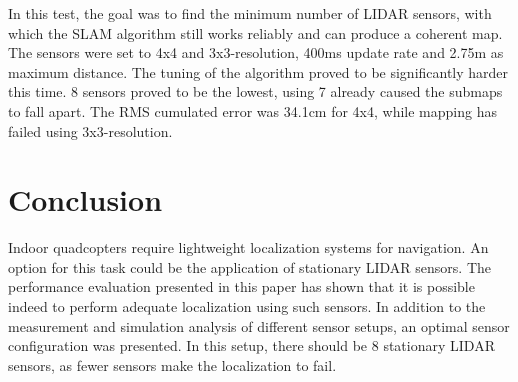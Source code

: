\documentclass[conference]{IEEEtran}
\begin{document}
In this test, the goal was to find the minimum number of LIDAR sensors, with which the SLAM algorithm still 
works reliably and can produce a coherent map. The sensors were set to 4x4 and 3x3-resolution, 400ms update 
rate and 2.75m as maximum distance. The tuning of the algorithm proved to be significantly harder this time. 
8 sensors proved to be the lowest, using 7 already caused the submaps to fall apart. The RMS cumulated error 
was 34.1cm for 4x4, while mapping has failed using 3x3-resolution.  


\section{Conclusion}
Indoor quadcopters require lightweight localization systems for navigation. An option for this task could be the application of stationary LIDAR sensors. The performance evaluation presented in this paper has shown that it is possible indeed to perform adequate localization using such sensors. In addition to the measurement and simulation analysis of different sensor setups, an optimal sensor configuration was presented. In this setup, there should be 8 stationary LIDAR sensors, as fewer sensors make the localization to fail.









%


\end{document}
